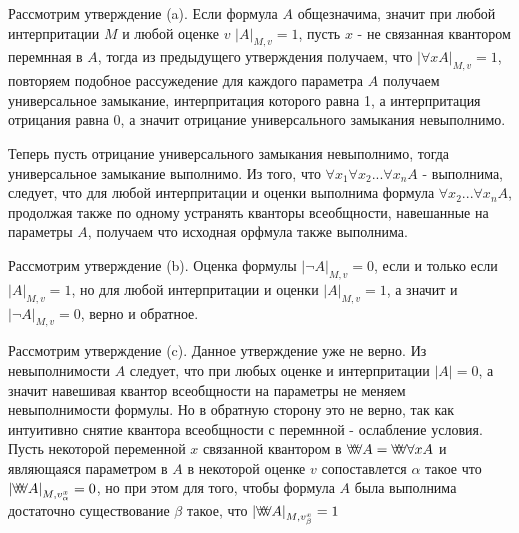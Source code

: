 \documentclass[a4paper,12pt]{article}
\begin{document}
\begin{Solution}
Рассмотрим утверждение (a). Если формула $A$ общезначима, значит при любой интерпритации $M$ и любой оценке $v$ $\left|A\right|_{M,v} = 1$, пусть $x$ - не связанная квантором перемнная в $A$, тогда из предыдущего утверждения получаем, что $\left|\forall x A\right|_{M, v} = 1$, повторяем подобное рассужедение для каждого параметра $A$ получаем универсальное замыкание, интерпритация которого равна 1, а интерпритация отрицания равна 0, а значит отрицание универсального замыкания невыполнимо.

Теперь пусть отрицание универсального замыкания невыполнимо, тогда универсальное замыкание выполнимо. Из того, что $\forall x_1 \forall x_2 ... \forall x_n A$ - выполнима, следует, что для любой интерпритации и оценки выполнима формула $\forall x_2 ... \forall x_n A$, продолжая также по одному устранять кванторы всеобщности, навешанные на параметры $A$, получаем что исходная орфмула также выполнима.

Рассмотрим утверждение (b). Оценка формулы $\left|\neg A\right|_{M, v} = 0$, если и только если $\left|A\right|_{M, v} = 1$, но для любой интерпритации и оценки $\left|A\right|_{M, v} = 1$, а значит и $\left|\neg A\right|_{M,v} = 0$, верно и обратное.

Рассмотрим утверждение (c). Данное утверждение уже не верно. Из невыполнимости $A$ следует, что при любых оценке и интерпритации $\left|A\right| = 0$, а значит навешивая квантор всеобщности на параметры не меняем невыполнимости формулы. Но в обратную сторону это не верно, так как интуитивно снятие квантора всеобщности с перемнной - ослабление условия. Пусть некоторой переменной $x$ связанной квантором в $\forall\negthickspace\forall\negthickspace\forall A = \forall\negthickspace\forall\negthickspace\forall \forall x A$ и являющаяся параметром в $A$ в некоторой оценке $v$ сопоставлется $\alpha$ такое что $\left|\forall\negthickspace\forall\negthickspace\forall A\right|_{M, v^{x}_{\alpha}} = 0$, но при этом для того, чтобы формула $A$ была выполнима достаточно существование $\beta$ такое, что $\left|\forall\negthickspace\forall\negthickspace\forall A\right|_{M, v^{x}_{\beta}}=1$
\end{Solution}
\end{document}

